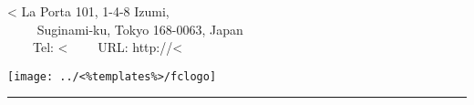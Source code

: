 \parbox[b]{\textwidth}{%
        \parbox[b]{0.80\textwidth}
        {\Large  <%
	 \normalsize La Porta 101, 1-4-8 Izumi, \\
　	 　Suginami-ku, Tokyo 168-0063, Japan \\
   　　Tel: <%
   　　URL: http://<%
         }
        \hfill
        \parbox[b]{0.19\textwidth}{
               \texttt{[image: ../<\%templates\%>/fclogo]}
        }
        \rule[1.5em]{\textwidth}{0.5pt}
}
